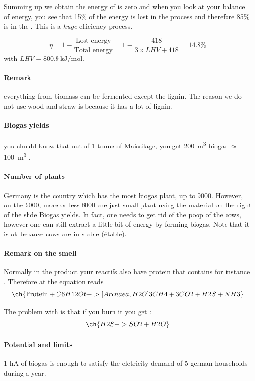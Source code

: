 \documentclass[10pt,a4paper]{article}
\begin{document}
 Summing up we obtain  the energy of  is zero and when you look at your balance of energy, you see that 15\% of the energy is lost in the process and therefore 85\% is in the . This is a \emph{huge} efficiency process. 
 
 \begin{equation}
 \label{Rendement}
  \eta = 1- \frac{\text{Lost energy}}{\text{Total energy}} = 1 - \frac{418}{3 \times LHV + 418}= 14.8 \% 
 \end{equation} 
with $LHV = \SI{800.9}{\kilo\joule\per\mole}$.
\paragraph{Remark}everything from biomass can be fermented except the lignin. The reason we do not use wood and straw is because it has a lot of lignin.

\paragraph{Biogas yields} you should know that out of 1 tonne of Maissilage, you get \SI{200}{\meter\cubed} biogas $\approx$ \SI{100}{\meter\cubed} .

\paragraph{Number of plants}Germany is the country which has the most biogas plant, up to 9000. However, on the 9000, more or less 8000 are just small plant using the material on the right of the slide Biogas yields. In fact, one needs to get rid of the poop of the cows, however one can still extract a little bit of energy by forming biogas. Note that it is ok because cows are in stable (étable).

\paragraph{Remark on the smell} Normally in the product your reactifs also have protein that contains for instance . Therefore at the equation reads 
$$\ch{\text{Protein} + C6H12O6 ->[Archaea, H2O] 3 CH4 + 3 CO2 + H2S + NH3}$$

The problem with  is that if you burn it you get :
$$\ch{H2S -> SO2 + H2O}$$

\paragraph{Potential and limits} 1 hA of biogas is enough to satisfy the eletricity demand of 5 german households during a year.
\end{document}
